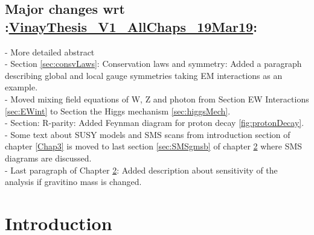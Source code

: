 \section{Major changes wrt :\href{https://drive.google.com/file/d/1SSACfyALGtIPKu9uGi-CTFbD_WoTAlaQ/view}{VinayThesis\_V1\_AllChaps\_19Mar19}:}
- More detailed abstract\\
- Section \ref{sec:consvLaws}: Conservation laws and symmetry: Added a paragraph describing global and local gauge symmetries taking EM interactions as an example.\\
- Moved mixing field equations of W, Z and photon from Section EW Interactions \ref{sec:EWint} to Section the Higgs mechanism \ref{sec:higgsMech}.\\
- Section: R-parity: Added Feynman diagram for proton decay \ref{fig:protonDecay}.\\
- Some text about SUSY models and SMS scans from introduction section of chapter \ref{Chap3} is moved to last section \ref{sec:SMSgmsb} of chapter \ref{Chap1} where SMS diagrams are discussed.\\
- Last paragraph of Chapter \ref{Chap1}: Added description about sensitivity of the analysis if gravitino mass is changed.\\

\chapter{Introduction} %

\label{Chap1} %


\newcommand{\keyword}[1]{\textbf{#1}}
\newcommand{\tabhead}[1]{\textbf{#1}}
\newcommand{\code}[1]{\texttt{#1}}
\newcommand{\file}[1]{\texttt{\bfseries#1}}
\newcommand{\option}[1]{\texttt{\itshape#1}}


